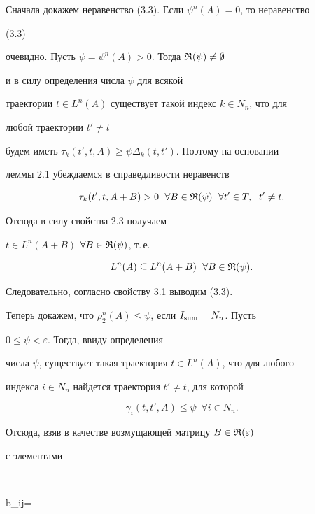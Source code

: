 \begin{pf} 


Сначала докажем неравенство (3.3). Если $\psi^n(A)=0$, то неравенство 


(3.3) 


очевидно. Пусть $\psi=\psi^n(A)>0$. Тогда $\frak R(\psi)\ne\emptyset$ 


и в силу определения числа $\psi$ для всякой 


траектории $t\in L^n(A)$ существует такой индекс $k\in N_n$, что для 


любой траектории $t'\ne t$ 


будем иметь $\tau_k(t',t,A)\ge\psi\Delta_k(t,t')$. Поэтому на основании 


леммы 2.1 убеждаемся в справедливости неравенств 


$$ 


\tau_k(t',t,A+B)>0\ \;\forall B\in\frak R(\psi) 


\ \;\forall t'\in T,\ \;t'\ne t. 


$$ 


Отсюда в силу свойства 2.3 получаем 


$t\in L^n(A+B)$ $\forall B\in\frak R(\psi)$, т.\,е. 


$$ 


L^n(A)\subseteq L^n(A+B)\ \;\forall B\in\frak R(\psi). 


$$ 


Следовательно, согласно свойству 3.1 выводим (3.3). 


 


Теперь докажем, что $\rho^n_2(A)\le\psi$, если $I_{\operatorname{sum}}=N_n$. Пусть 


$0\le\psi<\varepsilon$. Тогда, ввиду определения 


числа $\psi$, существует такая траектория $t\in L^n(A)$, что для любого 


индекса $i\in N_n$ найдется траектория $t'\ne t$, для которой 


$$ 


\gamma_i(t,t',A)\le\psi\ \;\forall i\in N_n. 


$$ 


 


Отсюда, взяв в качестве возмущающей матрицу $B\in\frak R(\varepsilon)$ 


с элементами 


$$ 


b_{ij}= 



\end{pf}

